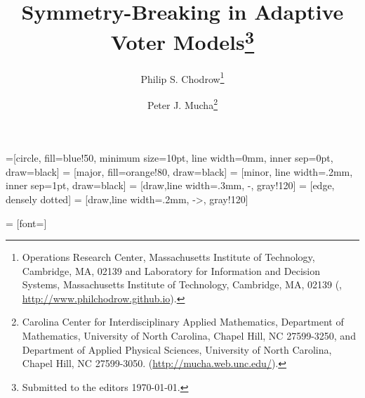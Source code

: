 

\usepackage{lipsum}
\usepackage{amsfonts}
\usepackage{graphicx}
\usepackage{epstopdf}
\usepackage{algorithmic}
\usepackage{tikz}
\usepackage{subcaption} 
\usepackage{pc_math}
\usepackage{amssymb}
\usepackage{bbm}
\usepackage[disable, color=gray!60]{todonotes}
\graphicspath{{fig/}}

=[circle, fill=blue!50, minimum size=10pt, line width=0mm, inner sep=0pt, draw=black]
 = [major, fill=orange!80, draw=black]
 = [minor, line width=.2mm, inner sep=1pt, draw=black]
 = [draw,line width=.3mm, -, gray!120]
 = [edge,  densely dotted]
 = [draw,line width=.2mm, ->, gray!120]


 = [font=\small]

\ifpdf
\else
\fi

\newcommand{\creflastconjunction}{, and~}



\title{Symmetry-Breaking in Adaptive Voter Models\thanks{Submitted to the editors \today.
}}

\author{Philip S. Chodrow\thanks{Operations Research Center, Massachusetts Institute of Technology, Cambridge, MA, 02139 and Laboratory for Information and Decision Systems, Massachusetts Institute of Technology, Cambridge, MA, 02139
  (, \url{http://www.philchodrow.github.io}).}
\and Peter J. Mucha\thanks{Carolina Center for Interdisciplinary Applied Mathematics, Department of Mathematics, University of North Carolina, Chapel Hill, NC 27599-3250, and Department of Applied Physical Sciences, University of North Carolina, Chapel Hill, NC 27599-3050. 
  (\url{http://mucha.web.unc.edu/}).}}

\usepackage{amsopn}
